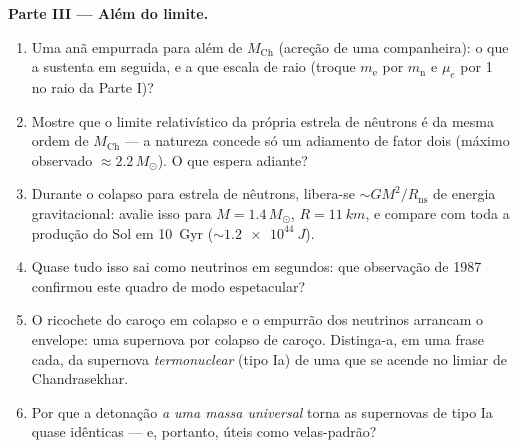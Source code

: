 \begin{problem}
\medskip\noindent\textbf{Parte III --- Além do limite.}
\begin{enumerate}[resume]
  \item Uma anã empurrada para além de $M_{\text{Ch}}$ (acreção de
        uma companheira): o que a sustenta em seguida, e a que escala
        de raio (troque $m_{\text{e}}$ por $m_{\text{n}}$ e
        $\mu_e$ por 1 no raio da Parte I)?
  \item Mostre que o limite relativístico da própria estrela de nêutrons
        é da mesma ordem de $M_{\text{Ch}}$ --- a natureza concede só um
        adiamento de fator dois (máximo observado $\approx
        2.2\,M_\odot$). O que espera adiante?
  \item Durante o colapso para estrela de nêutrons, libera-se
        $\sim GM^2/R_{
        \text{ns}}$ de energia gravitacional: avalie
        isso para $M = 1.4\,M_\odot$, $R = \qty{11}{km}$, e
        compare com toda a produção do Sol em \qty{10}{Gyr}
        ($\sim\qty{1.2e44}{J}$).
  \item Quase tudo isso sai como neutrinos em segundos: que
        observação de 1987 confirmou este quadro de modo espetacular?
  \item O ricochete do caroço em colapso e o empurrão dos neutrinos
        arrancam o envelope: uma supernova por colapso de caroço.
        Distinga-a, em uma frase cada, da supernova
        \emph{termonuclear} (tipo Ia) de uma  que se acende no
        limiar de Chandrasekhar.
  \item Por que a detonação \emph{a uma massa universal} torna
        as supernovas de tipo Ia quase idênticas --- e, portanto, úteis
        como velas-padrão?
\end{enumerate}


\end{problem}
